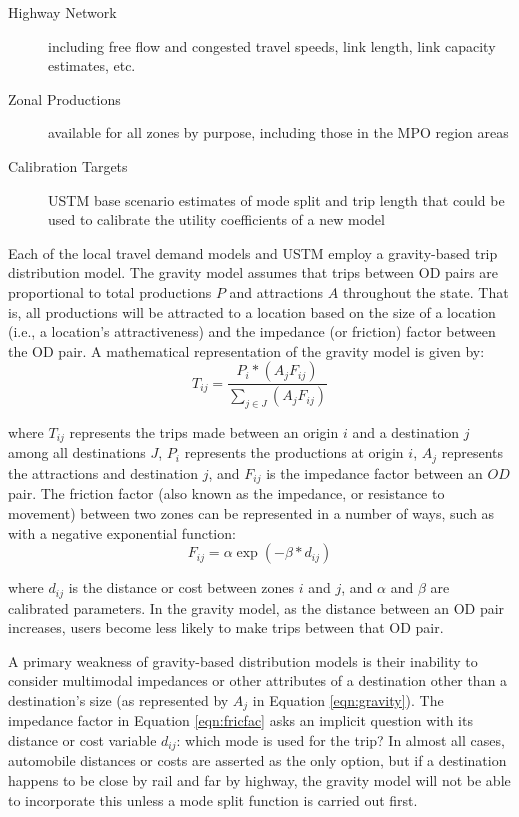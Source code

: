 \begin{description}
\def\labelenumi{\arabic{enumi}.}
\item
  [Highway Network] {including free flow and congested travel speeds,
  link length, link capacity estimates, etc.}
\item
  [Zonal Productions] {available for all zones by purpose,
  including those in the MPO region areas}
\item
  [Calibration Targets] {USTM base scenario estimates of mode split and
  trip length that could be used to calibrate the utility coefficients of a new model}
\end{description}

Each of the local travel demand models and USTM employ a gravity-based trip
distribution model. The gravity model assumes that trips between OD
pairs are proportional to total productions $P$ and
attractions $A$ throughout the state. That is, all productions will be
attracted to a location based on the size of a location (i.e., a location's
attractiveness) and the impedance (or friction) factor between the OD
pair. A mathematical representation of the gravity model is given by:
\begin{equation}
T_{ij}= \frac{P_i*(A_j F_{ij})}{\sum_{j\in J}(A_j F_{ij})}
 \label{eqn:gravity}
\end{equation}

\noindent where $T_{ij}$ represents the trips made between an origin $i$ and a
  destination $j$ among all destinations $J$, $P_i$ represents the productions at origin $i$, $A_j$ represents the attractions and destination $j$, and $F_{ij}$ is the impedance factor between an $OD$ pair.
The friction factor (also known as the impedance, or resistance to movement) between two
zones can be represented in a number of ways, such as with a negative
exponential function:
\begin{equation}
	F_{ij} = \alpha \exp(-\beta * d_{ij})
  \label{eqn:fricfac}
\end{equation}

\noindent where $d_{ij}$ is the distance or cost between zones $i$ and $j$, and $\alpha$
and $\beta$ are calibrated parameters. In the gravity model, as the distance
between an OD pair increases, users become less likely to make trips between
that OD pair.

A primary weakness of gravity-based distribution models is their inability to
consider multimodal impedances or other attributes of a destination other than
a destination's size (as represented by $A_j$ in Equation \ref{eqn:gravity}). The
impedance factor in Equation \ref{eqn:fricfac} asks an implicit question with its
distance or cost variable $d_{ij}$: which mode is used for the trip? In almost
all cases, automobile distances or costs are asserted as the only option, but if a
destination happens to be close by rail and far by highway, the gravity model
will not be able to incorporate this unless a mode split function is carried out first.

